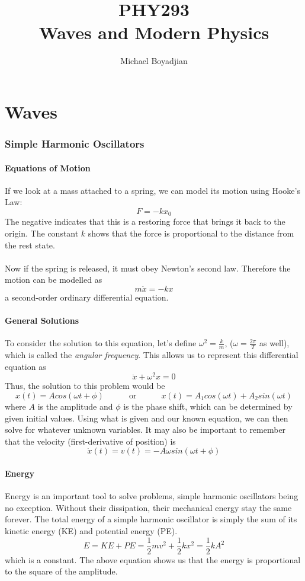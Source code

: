 \documentclass[11pt]{article}
\begin{document}
\title{PHY293 \\ Waves and Modern Physics}
\author{Michael Boyadjian}
\maketitle
\pagebreak

\tableofcontents

\pagebreak
\part{Waves}
\section{Simple Harmonic Oscillators}
\subsection{Equations of Motion}
If we look at a mass attached to a spring, we can model its motion using Hooke's Law:
$$ F = -kx_0$$
The negative indicates that this is a restoring force that brings it back to the origin. The constant $k$ shows that the force is proportional to the distance from the rest state.
\\ \\
Now if the spring is released, it must obey Newton's second law. Therefore the motion can be modelled as
$$ m \ddot x = -kx$$a second-order ordinary differential equation.
\subsection{General Solutions}
To consider the solution to this equation, let's define $\omega ^2 = \frac{k}{m}$, ($\omega = \frac{2\pi}{T}$ as well), which is called the \textit{angular frequency}. This allows us to represent this differential equation as $$ \ddot x + \omega ^2x = 0$$
Thus, the solution to this problem would be $$ x(t) = Acos(\omega t+\phi) \quad \quad \quad \text{or} \quad \quad \quad x(t) = A_1cos(\omega t) + A_2sin(\omega t)$$
where $A$ is the amplitude and $\phi$ is the phase shift, which can be determined by given initial values. Using what is given and our known equation, we can then solve for whatever unknown variables. It may also be important to remember that the velocity (first-derivative of position) is 
$$\dot x(t) = v(t) = -A\omega sin(\omega t + \phi )$$
\subsection{Energy}
Energy is an important tool to solve problems, simple harmonic oscillators being no exception. Without their dissipation, their mechanical energy stay the same forever. The total energy of a simple harmonic oscillator is simply the sum of its kinetic energy (KE) and potential energy (PE).
$$ E = KE + PE = \frac{1}{2}mv^2 + \frac{1}{2}kx^2 = \frac{1}{2}kA^2$$
which is a constant. The above equation shows us that the energy is proportional to the square of the amplitude.
\pagebreak
\end{document}
